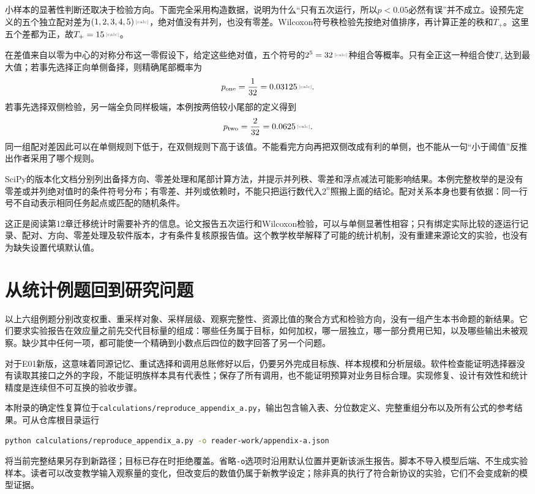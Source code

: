小样本的显著性判断还取决于检验方向。下面完全采用构造数据，说明为什么“只有五次运行，所以$p<0.05$必然有误”并不成立。设预先定义的五个独立配对差为$\calcnum{(1,2,3,4,5)}$，绝对值没有并列，也没有零差。Wilcoxon符号秩检验先按绝对值排序，再计算正差的秩和$T_+$。这里五个差都为正，故$T_+=\calcnum{15}$。

在差值来自以零为中心的对称分布这一零假设下，给定这些绝对值，五个符号的$2^5=\calcnum{32}$种组合等概率。只有全正这一种组合使$T_+$达到最大值；若事先选择正向单侧备择，则精确尾部概率为
\[
 p_{\mathrm{one}}=\frac{1}{32}=\calcnum{0.03125}.
\]
若事先选择双侧检验，另一端全负同样极端，本例按两倍较小尾部的定义得到
\[
 p_{\mathrm{two}}=\frac{2}{32}=\calcnum{0.0625}.
\]
同一组配对差因此可以在单侧规则下低于，在双侧规则下高于该值。不能看完方向再把双侧改成有利的单侧，也不能从一句“小于阈值”反推出作者采用了哪个规则。

SciPy的版本化文档分别列出备择方向、零差处理和尾部计算方法，并提示并列秩、零差和浮点减法可能影响结果\cite{scipy-wilcoxon-116}。本例完整枚举的是没有零差或并列绝对值时的条件符号分布；有零差、并列或依赖时，不能只把运行数代入$2^n$照搬上面的结论。配对关系本身也要有依据：同一行号不自动表示相同任务起点或匹配的随机条件。

这正是阅读第12章迁移统计时需要补齐的信息。论文报告五次运行和Wilcoxon检验，可以与单侧显著性相容；只有绑定实际比较的逐运行记录、配对、方向、零差处理及软件版本，才有条件复核原报告值。这个教学枚举解释了可能的统计机制，没有重建来源论文的实验，也没有为缺失设置代填默认值。

\section{从统计例题回到研究问题}

以上六组例题分别改变权重、重采样对象、采样层级、观察完整性、资源比值的聚合方式和检验方向，没有一组产生本书命题的新结果。它们要求实验报告在效应量之前先交代目标量的组成：哪些任务属于目标，如何加权，哪一层独立，哪一部分费用已知，以及哪些输出未被观察。缺少其中任何一项，都可能使一个精确到小数点后四位的数字回答了另一个问题。

对于E01新版，这意味着同源记忆、重试选择和调用总账修好以后，仍要另外完成目标族、样本规模和分析层级。软件检查能证明选择器没有读取其接口之外的字段，不能证明族样本具有代表性；保存了所有调用，也不能证明预算对业务目标合理。实现修复、设计有效性和统计精度是连续但不可互换的验收步骤。

本附录的确定性复算位于\texttt{calculations/reproduce\_appendix\_a.py}，输出包含输入表、分位数定义、完整重组分布以及所有公式的参考结果。可从仓库根目录运行
\begin{lstlisting}[language=bash]
python calculations/reproduce_appendix_a.py -o reader-work/appendix-a.json
\end{lstlisting}
将当前完整结果另存到新路径；目标已存在时拒绝覆盖。省略\texttt{-o}选项时沿用默认位置并更新该派生报告。脚本不导入模型后端、不生成实验样本。读者可以改变教学输入观察量的变化，但改变后的数值仍属于新教学设定；除非真的执行了符合新协议的实验，它们不会变成新的模型证据。
